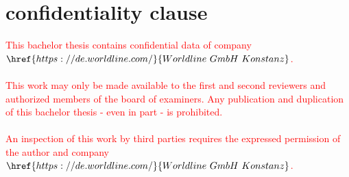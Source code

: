 \section*{confidentiality clause}
\textcolor{red}{
This bachelor thesis contains confidential data of company $\href{https://de.worldline.com/}{Worldline \ GmbH \ Konstanz}$.\\ \\
This work may only be made available to the first and second reviewers and authorized members of the board of examiners. Any publication and duplication of this bachelor thesis - even in part - is prohibited.\\\\
 An inspection of this work by third parties requires the expressed permission of the author and company $\href{https://de.worldline.com/}{Worldline \ GmbH \ Konstanz}$.
}
